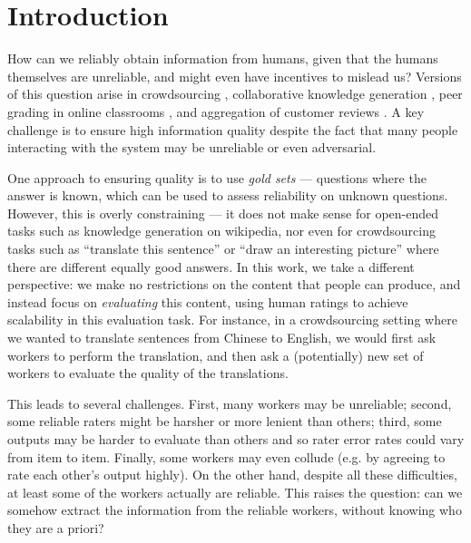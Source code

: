 \section{Introduction}
\label{sec:intro}


How can we reliably obtain information from humans, given that the humans 
themselves are unreliable, and might even have incentives to mislead us?
Versions of this question arise in crowdsourcing \citep{vuurens2011spam}, 
collaborative knowledge generation \citep{priedhorsky2007creating}, peer grading 
in online classrooms \citep{kulkarni2015peer,piech2013tuned}, and aggregation 
of customer reviews \citep{harmon2004amazon}. A key challenge is to ensure 
high information quality despite the fact that many people interacting with 
the system may be unreliable or even adversarial.

One approach to ensuring quality is to use \emph{gold sets} --- questions where 
the answer is known, which can be used to assess reliability on unknown questions. 
However, this is overly constraining --- it does not make sense for open-ended 
tasks such as knowledge generation on wikipedia, nor even for crowdsourcing 
tasks such as ``translate this sentence'' or ``draw an interesting picture'' 
where there are different equally good answers. 
In this work, we take a different perspective: we make no restrictions on the 
content that people can produce, and instead focus on \emph{evaluating} this 
content, using human ratings to achieve scalability in this evaluation task. 
For instance, in a crowdsourcing setting where we wanted to translate sentences 
from Chinese to English, we would first ask workers to perform the translation, 
and then ask a (potentially) new set of workers to evaluate the quality of 
the translations.

This leads to several challenges. First, many workers may be unreliable; 
second, some reliable raters might be harsher or more lenient than others; 
third, some outputs may be harder to evaluate than others 
and so rater error rates could vary from item to item. 
Finally, some 
workers may even collude (e.g. by agreeing to rate each other's output highly).
On the other hand, despite all these difficulties, at least some of the workers 
actually are reliable. This raises the question: can we somehow extract the 
information from the reliable workers, without knowing who they are a priori?

